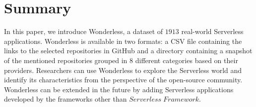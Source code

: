 \section{Summary}
\label{summary}

In this paper, we introduce Wonderless, a dataset of $1913$ 
real-world Serverless applications. Wonderless is available in two 
formats: a CSV file containing the links to the selected repositories 
in GitHub and a directory containing a snapshot of the mentioned 
repositories grouped in 8 different categories based on their providers. 
Researchers can use Wonderless to explore the Serverless world and 
identify its characteristics from the perspective of the open-source 
community. Wonderless can be extended in the future by adding 
Serverless applications developed by the frameworks other than 
$Serverless \; Framework$.

